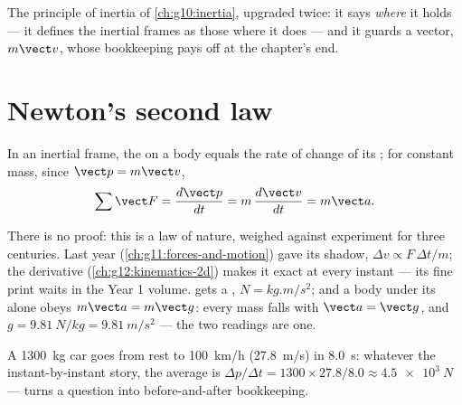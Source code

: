 \begin{remark}\label{rem:g12:newtons-laws:sharpened}
The principle of inertia of \cref{ch:g10:inertia}, upgraded twice: it says
\emph{where} it holds --- it defines the inertial frames as those where it does ---
and it guards a vector, $m\vect v$, whose bookkeeping pays off at the chapter's end.
\end{remark}

\section{Newton's second law}

\begin{theorem}\label{thm:g12:newtons-laws:second}
In an inertial frame, the  on a body equals the rate of change of its
; for constant mass, since $\vect p = m\vect v$,
\[
\sum \vect F = \frac{d\vect p}{dt} = m\,\frac{d\vect v}{dt} = m \vect a .
\]
\end{theorem}
\admitted

\begin{remark}\label{rem:g12:newtons-laws:nature}
There is no proof: this is a law of nature, weighed against experiment for three
centuries. Last year (\cref{ch:g11:forces-and-motion}) gave its shadow,
$\Delta v \propto F\,\Delta t/m$; the derivative (\cref{ch:g12:kinematics-2d}) makes
it exact at every instant --- its fine print waits in the Year 1 volume.  gets a
, $\unit{N} = \unit{kg.m/s^2}$; and a body under its  alone obeys
$m\vect a = m\vect g$: every mass falls with $\vect a = \vect g$, and
$g = \qty{9.81}{N/kg} = \qty{9.81}{m/s^2}$ --- the two readings are one.
\end{remark}

\begin{example}\label{ex:g12:newtons-laws:average}
A \qty{1300}{kg} car goes from rest to \qty{100}{km/h} (\qty{27.8}{m/s}) in
\qty{8.0}{s}: whatever the instant-by-instant story, the average  is
$\Delta p/\Delta t = 1300 \times 27.8/8.0 \approx \qty{4.5e3}{N}$ ---  turns
a  question into before-and-after bookkeeping.
\end{example}

